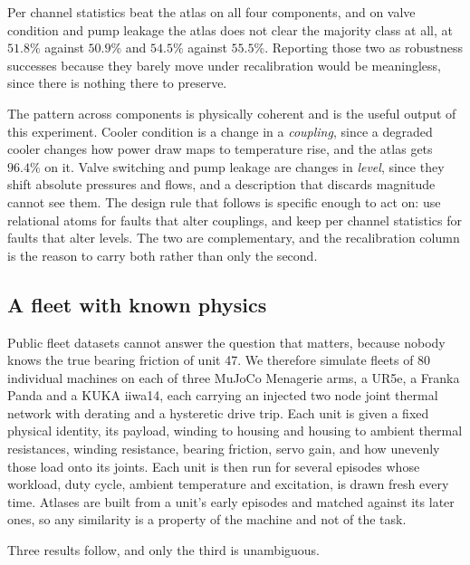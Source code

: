 \documentclass[11pt]{article}
\begin{document}
Per channel statistics beat the atlas on all four components, and on valve
condition and pump leakage the atlas does not clear the majority class at all,
at $51.8\%$ against $50.9\%$ and $54.5\%$ against $55.5\%$. Reporting those two
as robustness successes because they barely move under recalibration would be
meaningless, since there is nothing there to preserve.

The pattern across components is physically coherent and is the useful output
of this experiment. Cooler condition is a change in a \emph{coupling}, since a
degraded cooler changes how power draw maps to temperature rise, and the atlas
gets $96.4\%$ on it. Valve switching and pump leakage are changes in
\emph{level}, since they shift absolute pressures and flows, and a description
that discards magnitude cannot see them. The design rule that follows is
specific enough to act on: use relational atoms for faults that alter couplings,
and keep per channel statistics for faults that alter levels. The two are
complementary, and the recalibration column is the reason to carry both rather
than only the second.

\subsection{A fleet with known physics}\label{sec:fleet}

Public fleet datasets cannot answer the question that matters, because nobody
knows the true bearing friction of unit 47. We therefore simulate fleets of 80
individual machines on each of three MuJoCo Menagerie arms, a UR5e, a Franka
Panda and a KUKA iiwa14, each carrying an injected two node joint thermal
network with derating and a hysteretic drive trip. Each unit is given a fixed
physical identity, its payload, winding to housing and housing to ambient
thermal resistances, winding resistance, bearing friction, servo gain, and how
unevenly those load onto its joints. Each unit is then run for several episodes
whose workload, duty cycle, ambient temperature and excitation, is drawn fresh
every time. Atlases are built from a unit's early episodes and matched against
its later ones, so any similarity is a property of the machine and not of the
task.

Three results follow, and only the third is unambiguous.
\end{document}
